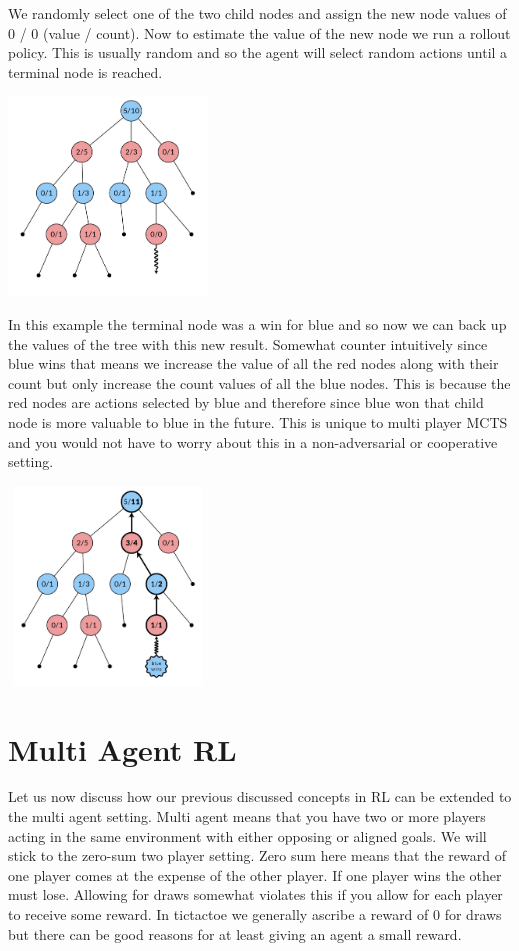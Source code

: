 We randomly select one of the two child nodes and assign the new node values of 0 / 0 (value / count). Now to estimate the value of the new node we run a rollout policy. This is usually random and so the agent will select random actions until a terminal node is reached. 

\includegraphics[width=200px,height=200px]{images/mcts_simulation.png}

In this example the terminal node was a win for blue and so now we can back up the values of the tree with this new result. Somewhat counter intuitively since blue wins that means we increase the value of all the red nodes along with their count but only increase the count values of all the blue nodes. This is because the red nodes are actions selected by blue and therefore since blue won that child node is more valuable to blue in the future. This is unique to multi player MCTS and you would not have to worry about this in a non-adversarial or cooperative setting. 

\includegraphics[width=200px,height=200px]{images/mcts_backpropagation.png}

\section{Multi Agent RL}

Let us now discuss how our previous discussed concepts in RL can be extended to the multi agent setting. Multi agent means that you have two or more players acting in the same environment with either opposing or aligned goals. We will stick to the zero-sum two player setting. Zero sum here means that the reward of one player comes at the expense of the other player. If one player wins the other must lose. Allowing for draws somewhat violates this if you allow for each player to receive some reward. In tictactoe we generally ascribe a reward of 0 for draws but there can be good reasons for at least giving an agent a small reward. 

